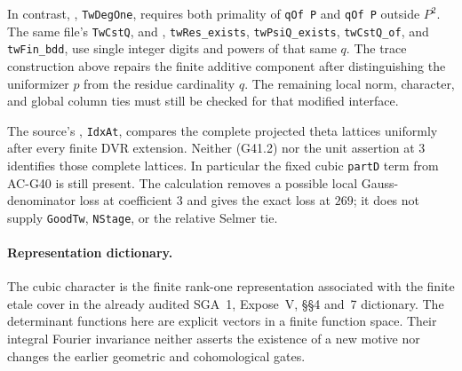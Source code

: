 In contrast,
,
\texttt{TwDegOne}, requires both primality of
\texttt{qOf P} and \texttt{qOf P} outside $P^2$.
The same file's \texttt{TwCstQ}, and
,
\texttt{twRes\_exists}, \texttt{twPsiQ\_exists},
\texttt{twCstQ\_of}, and \texttt{twFin\_bdd}, use single
integer digits and powers of that same $q$.  The trace
construction above repairs the finite additive component
after distinguishing the uniformizer $p$ from the residue
cardinality $q$.  The remaining local norm, character,
and global column ties must still be checked for that
modified interface.

The source's
,
\texttt{IdxAt}, compares the complete projected theta
lattices uniformly after every finite DVR extension.
Neither (G41.2) nor the unit assertion at $3$ identifies
those complete lattices.  In particular the fixed cubic
\texttt{partD} term from AC-G40 is still present.  The
calculation removes a possible local Gauss-denominator
loss at coefficient $3$ and gives the exact loss at $269$;
it does not supply \texttt{GoodTw}, \texttt{NStage},
or the relative Selmer tie.

\paragraph{Representation dictionary.}
The cubic character is the finite rank-one representation
associated with the finite etale cover in the already audited
SGA~1, Expose~V, \S\S4 and~7 dictionary.  The determinant
functions here are explicit vectors in a finite function
space.  Their integral Fourier invariance neither asserts
the existence of a new motive nor changes the earlier
geometric and cohomological gates.
